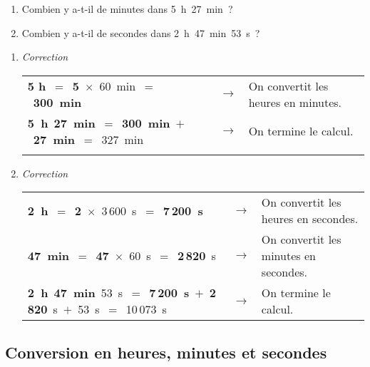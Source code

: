 \begin{exemple*1}
\begin{enumerate}
 \item Combien y a-t-il de minutes dans 5 h 27 min ?
 \item Combien y a-t-il de secondes dans 2 h 47 min 53 s ?
 \end{enumerate}
 




\begin{enumerate}
 
 \item \emph{Correction}

\begin{tabular}{lcl} 
\textcolor{bleu}{\textbf{5 h}} $=$ \textcolor{bleu}{\textbf{5}} $\times$ 60 min $=$ \textcolor{bleu}{\textbf{300 min}}  & $\longrightarrow$ & On convertit les heures en minutes. \\
\textcolor{bleu}{\textbf{5 h}} \textcolor{vert}{\textbf{27 min}} $=$ \textcolor{bleu}{\textbf{300 min}} $+$ \textcolor{vert}{\textbf{27 min}} $=$ 327 min & $\longrightarrow$ & On termine le calcul.\\
\phantom{2 h 47 min 53 s $=$ 7\,200 s $+$ 2\,820 s $+$ 53 s $=$ 10\,073 s} & \\ %
 \end{tabular} 
 
 \item \emph{Correction}
 
\begin{tabular}{lcl} 
\textcolor{bleu}{\textbf{2 h}} $=$ \textcolor{bleu}{\textbf{2}} $\times$ 3\,600 s $=$ \textcolor{bleu}{\textbf{7\,200 s}} & $\longrightarrow$ & On convertit les heures en secondes. \\
\textcolor{vert}{\textbf{47 min}} $=$ \textcolor{vert}{\textbf{47}} $\times$ 60 s $=$ \textcolor{vert}{\textbf{2\,820}} s & $\longrightarrow$ & On convertit les minutes en secondes. \\
\textcolor{bleu}{\textbf{2 h}} \textcolor{vert}{\textbf{47 min}} 53 s $=$ \textcolor{bleu}{\textbf{7\,200 s}} $+$ \textcolor{vert}{\textbf{2\,820}} s $+$ 53 s $=$ 10\,073 s & $\longrightarrow$ & On termine le calcul. \\
 \end{tabular}
 \end{enumerate}
\end{exemple*1}

\subsection{Conversion en heures, minutes et secondes}

